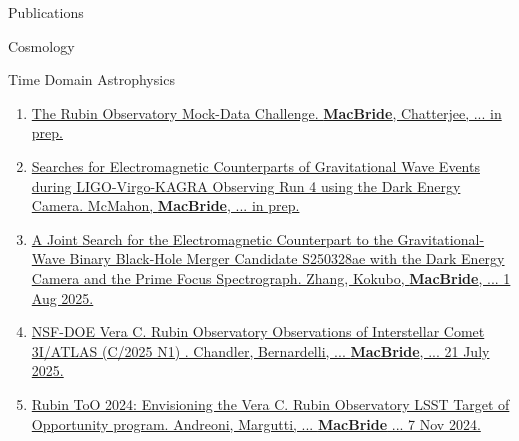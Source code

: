 \documentclass{resume} %
\begin{document}
\begin{rSection}{Publications}
\begin{rSubsection}{Cosmology}{}{}{}
\begin{enumerate}
    
\end{enumerate}
\end{rSubsection}

\begin{rSubsection}{Time Domain Astrophysics}{}{}{}
\begin{enumerate}
    \item \href{}{The Rubin Observatory Mock-Data Challenge. \textbf{MacBride}, Chatterjee, ... in prep.} 
    \item \href{}{Searches for Electromagnetic Counterparts of Gravitational Wave Events during LIGO-Virgo-KAGRA Observing Run 4 using the Dark Energy Camera. McMahon, \textbf{MacBride}, ... in prep.} 
    \item \href{https://arxiv.org/abs/2508.00291}{A Joint Search for the Electromagnetic Counterpart to the Gravitational-Wave Binary Black-Hole Merger Candidate S250328ae with the Dark Energy Camera and the Prime Focus Spectrograph. Zhang, Kokubo, \textbf{MacBride}, ... 1 Aug 2025.} 
    \item \href{https://arxiv.org/pdf/2507.13409}{NSF-DOE Vera C. Rubin Observatory Observations of Interstellar Comet 3I/ATLAS (C/2025 N1) . Chandler, Bernardelli, ... \textbf{MacBride}, ... 21 July 2025.} 
    \item \href{https://arxiv.org/abs/2411.04793}{Rubin ToO 2024: Envisioning the Vera C. Rubin Observatory LSST Target of Opportunity program. Andreoni, Margutti, ... \textbf{MacBride} ... 7 Nov 2024.} 
\end{enumerate}
\end{rSubsection}


\end{rSection}
\end{document}
